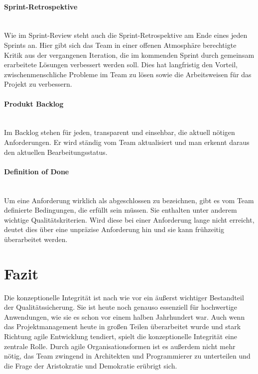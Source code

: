 \documentclass[a4paper, ngerman, 12pt, usenames, dvipsnames]{article}
\begin{document}
    \paragraph{Sprint-Retrospektive}\mbox{} \\
    Wie im Sprint-Review steht auch die Sprint-Retrospektive am Ende eines jeden Sprints an. Hier gibt sich das Team in einer offenen Atmosphäre berechtigte Kritik aus der vergangenen Iteration, die im kommenden Sprint durch gemeinsam erarbeitete Lösungen verbessert werden soll.
    Dies hat langfristig den Vorteil, zwischenmenschliche Probleme im Team zu lösen sowie die Arbeitsweisen für das Projekt zu verbessern.
    \paragraph{Produkt Backlog}\mbox{} \\
    Im Backlog stehen für jeden, transparent und einsehbar, die aktuell nötigen Anforderungen. 
    Er wird ständig vom Team aktualisiert und man erkennt daraus den aktuellen Bearbeitungsstatus.
    \paragraph{Definition of Done}\mbox{} \\
    Um eine Anforderung wirklich als abgeschlossen zu bezeichnen, gibt es vom Team definierte Bedingungen, die erfüllt sein müssen.
    Sie enthalten unter anderem wichtige Qualitätskriterien. Wird diese bei einer Anforderung lange nicht erreicht, deutet dies über eine unpräzise Anforderung hin und sie kann frühzeitig überarbeitet werden.
\pagebreak
\section{Fazit}
    Die konzeptionelle Integrität ist nach wie vor ein äußerst wichtiger Bestandteil der Qualitätssicherung. Sie ist heute noch genauso essenziell für hochwertige Anwendungen, wie sie es schon vor einem halben Jahrhundert war. Auch wenn das Projektmanagement heute in großen Teilen überarbeitet wurde und stark Richtung agile Entwicklung tendiert, spielt die konzeptionelle Integrität eine zentrale Rolle. Durch agile Organisationsformen ist es außerdem nicht mehr nötig, das Team zwingend in Architekten und Programmierer zu unterteilen und die Frage der Aristokratie und Demokratie erübrigt sich.


\end{document}
